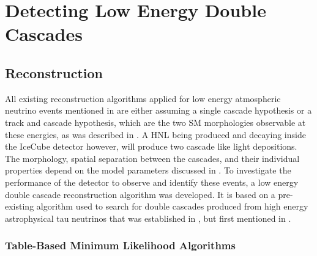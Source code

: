 \setchapterpreamble[u]{\margintoc}

\chapter{Detecting Low Energy Double Cascades}


\section{Reconstruction} 

All existing reconstruction algorithms applied for low energy atmospheric neutrino events mentioned in  are either assuming a single cascade hypothesis or a track and cascade hypothesis, which are the two SM morphologies observable at these energies, as was described in . A HNL being produced and decaying inside the IceCube detector however, will produce two cascade like light depositions. The morphology, spatial separation between the cascades, and their individual properties depend on the model parameters discussed in . 
To investigate the performance of the detector to observe and identify these events, a low energy double cascade reconstruction algorithm was developed. It is based on a pre-existing algorithm used to search for double cascades produced from high energy astrophysical tau neutrinos  that was established in , but first mentioned in .


\subsection{Table-Based Minimum Likelihood Algorithms}

